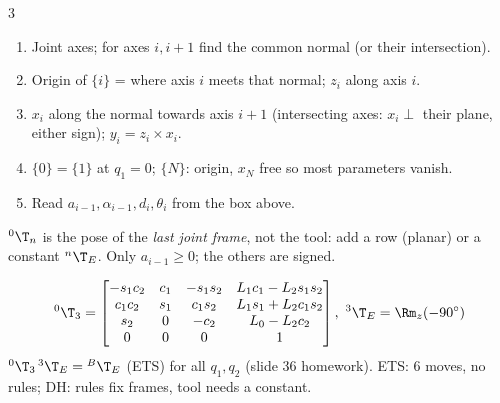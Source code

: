 \begin{multicols}{3}
\begin{deriv}
\end{deriv}
\begin{recipe}
\begin{enumerate}
\item Joint axes; for axes $i,i{+}1$ find the common normal (or their intersection).
\item Origin of $\{i\}$ = where axis $i$ meets that normal; $z_i$ along axis $i$.
\item $x_i$ along the normal towards axis $i{+}1$ (intersecting axes: $x_i\perp$ their plane, either sign); $y_i=z_i\times x_i$.
\item $\{0\}=\{1\}$ at $q_1=0$; $\{N\}$: origin, $x_N$ free so most parameters vanish.
\item Read $a_{i-1},\alpha_{i-1},d_i,\theta_i$ from the box above.
\end{enumerate}
\end{recipe}
\begin{trap}
${}^0\T_n$ is the pose of the \emph{last joint frame}, not the tool: add a row (planar) or a constant ${}^n\T_E$. Only $a_{i-1}\ge0$; the others are signed.
\end{trap}
\begin{worked}
\begin{center}\end{center}
\[{}^0\T_3=\begin{bmatrix}-s_1c_2&c_1&-s_1s_2&L_1c_1-L_2s_1s_2\\c_1c_2&s_1&c_1s_2&L_1s_1+L_2c_1s_2\\s_2&0&-c_2&L_0-L_2c_2\\0&0&0&1\end{bmatrix},\ {}^3\T_E=\Rm_z(-90^\circ)\]
${}^0\T_3\,{}^3\T_E={}^B\T_E$ (ETS) for all $q_1,q_2$ (slide 36 homework). ETS: 6 moves, no rules; DH: rules fix frames, tool needs a constant. \chk
\end{worked}


\end{multicols}
